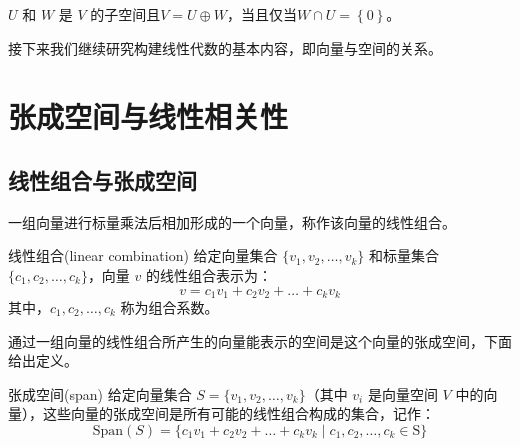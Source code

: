 \begin{corollary}
	$U$ 和 $W$ 是 $V$ 的子空间且$V=U\oplus W$，当且仅当$W\cap U=\left\{ 0 \right\}$。
\end{corollary}

接下来我们继续研究构建线性代数的基本内容，即向量与空间的关系。

\section{张成空间与线性相关性}

\subsection{线性组合与张成空间}

一组向量进行标量乘法后相加形成的一个向量，称作该向量的线性组合。

\begin{definition}{线性组合(linear combination)}
	给定向量集合 $\{v_1, v_2, \dots, v_k\}$ 和标量集合 $\{c_1, c_2, \dots, c_k\}$，向量 $v$ 的线性组合表示为：$$v = c_1 v_1 + c_2 v_2 + \dots + c_k v_k$$其中，$c_1, c_2, \dots, c_k$ 称为组合系数。
\end{definition}

通过一组向量的线性组合所产生的向量能表示的空间是这个向量的张成空间，下面给出定义。

\begin{definition}{张成空间(span)}
	给定向量集合 $ S = \{v_1, v_2, \dots, v_k\} $（其中 $ v_i $ 是向量空间 $ V $ 中的向量），这些向量的张成空间是所有可能的线性组合构成的集合，记作：$$\text{Span}(S) = \{ c_1 v_1 + c_2 v_2 + \dots + c_k v_k \mid c_1, c_2, \dots, c_k \in \mathrm{S} \}$$
\end{definition}

